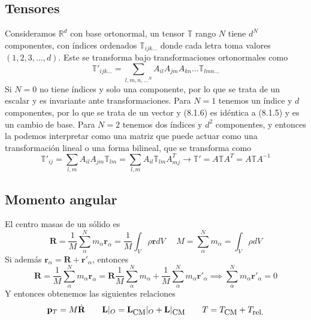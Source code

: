 \subsection{Tensores}
Consideramos $\mathbb{R}^d$ con base ortonormal, un tensor $\mathbb{T}$ rango $N$ tiene $d^N$ componentes, con índices ordenados $\mathbb{T}_{ijk \dots}$ donde cada letra toma valores $(1,2,3,\dots,d)$. Este se transforma bajo transformaciones ortonormales como
\begin{equation} \label{6.1.1}
    \mathbb{T}'_{ijk \dots} = \sum_{l,m,n,\dots^N} A_{il} A_{jm} A_{kn} \dots \mathbb{T}_{lmn \dots}
\end{equation} 
Si $N=0$ no tiene índices y solo una componente, por lo que se trata de un escalar y es invariante ante transformaciones.
Para $N=1$ tenemos un índice y $d$ componentes, por lo que se trata de un vector y (8.1.6) es idéntica a (8.1.5) y es un cambio de base.
Para $N=2$ tenemos dos índices y $d^2$ componentes, y entonces la podemos interpretar como una matriz que puede actuar como una transformación lineal o una forma bilineal, que se transforma como 
\begin{equation} \label{6.1.1}
    \mathbb{T}'_{ij} = \sum_{l,m} A_{il} A_{jm} \mathbb{T}_{lm} = \sum_{l,m} A_{il} \mathbb{T}_{lm} A^T_{mj} \rightarrow  \mathbb{T}' = A \mathbb{T} A^T = A \mathbb{T} A^{-1}
\end{equation} 
\vspace{-25pt}
\subsection{Momento angular}
El centro masas de un sólido es
\begin{equation} \label{6.1.1}
    \mathbf{R} = \frac{1}{M} \sum_\alpha^N m_\alpha \mathbf{r}_\alpha = \frac{1}{M} \int_V \rho \mathbf{r} dV \ \ \ \ \ \ M = \sum_\alpha^N m_\alpha=\int_V \rho dV
\end{equation} 
Si además $\mathbf{r}_\alpha = \mathbf{R} + \mathbf{r}'_\alpha$, entonces
\begin{equation} \label{6.1.1}
    \mathbf{R} = \frac{1}{M} \sum_\alpha^N m_\alpha \mathbf{r}_\alpha = \mathbf{R} \frac{1}{M} \sum_\alpha^N m_\alpha + \frac{1}{M} \sum_\alpha^N m_\alpha \mathbf{r}'_\alpha \implies \sum_\alpha^N m_\alpha \mathbf{r}'_\alpha = 0
\end{equation} 
Y entonces obtenemos las siguientes relaciones
\begin{equation} \label{6.1.1}
    \mathbf{p}_T = M \dot{\mathbf{R}} \ \ \ \ \ \ \mathbf{L}|_O = \mathbf{L}_{\mbox{\small CM}}|_O+\mathbf{L}|_{\mbox{\small CM}}  \ \ \ \ \ \ T = T_{\mbox{\small CM}} + T_{\mbox{\small rel.}}
\end{equation} 
\vspace{-30pt}
